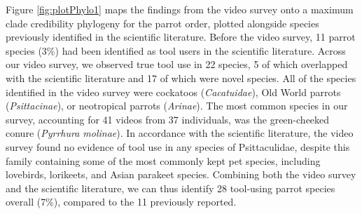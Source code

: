 \documentclass[
  man,floatsintext]{apa6}
\begin{document}
Figure \ref{fig:plotPhylo1} maps the findings from the video survey onto a
maximum clade credibility phylogeny for the parrot order, plotted alongside
species previously identified in the scientific literature. Before the video
survey, 11 parrot species (3\%) had been identified as tool users in the
scientific literature. Across our video survey, we observed true tool use in
22
species, 5 of which overlapped with the scientific literature and
17
of which were novel species. All of the species identified in the video survey
were cockatoos (\emph{Cacatuidae}), Old World parrots (\emph{Psittacinae}), or neotropical
parrots (\emph{Arinae}). The most common species in our survey, accounting for
41 videos from
37
individuals, was the green-cheeked conure (\emph{Pyrrhura molinae}). In accordance
with the scientific literature, the video survey found no evidence of tool use
in any species of Psittaculidae, despite this family containing some of the most
commonly kept pet species, including lovebirds, lorikeets, and Asian parakeet
species. Combining both the video survey and the scientific literature, we can
thus identify 28 tool-using parrot species overall (7\%), compared to the 11
previously reported.
\end{document}
